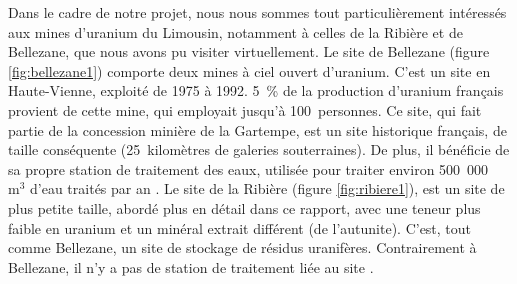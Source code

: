 \documentclass{article}
\begin{document}
Dans le cadre de notre projet, nous nous sommes tout particulièrement intéressés aux mines d'uranium du Limousin, notamment à celles de la Ribière et de Bellezane, que nous avons pu visiter virtuellement. Le site de Bellezane (figure \ref{fig:bellezane1}) comporte deux mines à ciel ouvert d'uranium. C’est un site en Haute-Vienne, exploité de 1975 à 1992. 5~\% de la production d’uranium français provient de cette mine, qui employait jusqu’à 100~personnes. Ce site, qui fait partie de la concession minière de la Gartempe, est un site historique français, de taille conséquente (25~kilomètres de galeries souterraines). De plus, il bénéficie de sa propre station de traitement des eaux, utilisée pour traiter environ 500~000~$\text{m}^3$ d’eau traités par an \cite{benesteau_site_2020}. Le site de la Ribière (figure \ref{fig:ribiere1}), est un site de plus petite taille, abordé plus en détail dans ce rapport, avec une teneur plus faible en uranium et un minéral extrait différent (de l’autunite). C’est, tout comme Bellezane, un site de stockage de résidus uranifères. Contrairement à Bellezane, il n’y a pas de station de traitement liée au site \cite{descostes_introduction_2020}.

\end{document}
